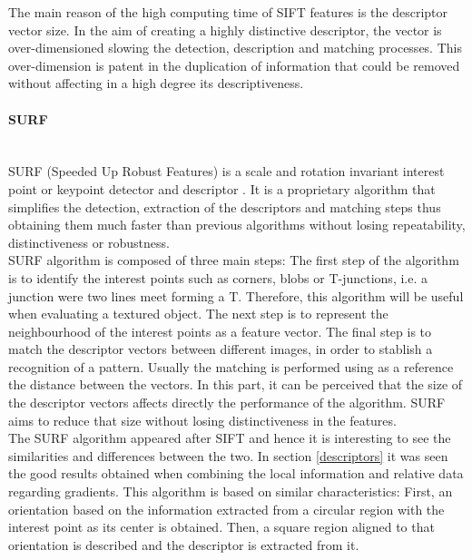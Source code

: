 The main reason of the high computing time of SIFT features is the descriptor vector size. 
In the aim of creating a highly distinctive descriptor, the vector is over-dimensioned slowing the detection, description and matching processes. 
This over-dimension is patent in the duplication of information that could be removed without affecting in a high degree its descriptiveness. 




\paragraph{SURF}\mbox{}\\

SURF (Speeded Up Robust Features) is a scale and rotation invariant interest point or keypoint detector and descriptor \cite{surf}. 
It is a proprietary algorithm that simplifies the detection, extraction of the descriptors and matching steps thus obtaining them much faster than previous algorithms without losing repeatability, distinctiveness or robustness. 
\\

SURF algorithm is composed of three main steps: 
The first step of the algorithm is to identify the interest points such as corners, blobs or T-junctions, i.e. a junction were two lines meet forming a T. 
Therefore, this algorithm will be useful when evaluating a textured object.
The next step is to represent the neighbourhood of the interest points as a feature vector. 
The final step is to match the descriptor vectors between different images, in order to stablish a recognition of a pattern. Usually the matching is performed using as a reference the distance between the vectors. 
In this part, it can be perceived that the size of the descriptor vectors affects directly the performance of the algorithm. SURF aims to reduce that size without losing distinctiveness in the features. 
\\
\newpage
The SURF algorithm appeared after SIFT and hence it is interesting to see the similarities and differences between the two. 
In section \ref{descriptors} it was seen the good results obtained when combining the local information and relative data regarding gradients. This algorithm is based on similar characteristics: 
First, an orientation based on the information extracted from a circular region with the interest point as its center is obtained. Then, a square region aligned to that orientation is described and the descriptor is extracted from it.  
\\

